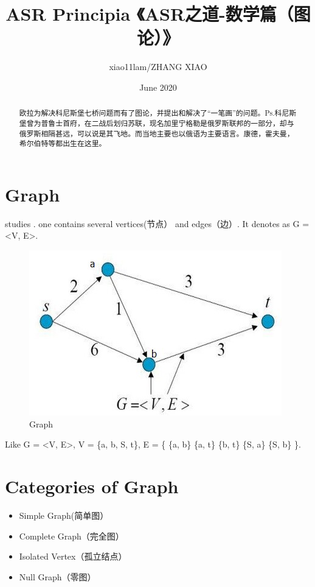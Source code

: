 \documentclass{article}
\title{ASR Principia 《ASR之道-数学篇（图论）》}
\author{xiao11lam/ZHANG XIAO }
\date{June 2020}
\begin{document}
\maketitle
\begin{abstract}
欧拉为解决科尼斯堡七桥问题而有了图论，并提出和解决了“一笔画”的问题。Ps.科尼斯堡曾为普鲁士首府，在二战后划归苏联，现名加里宁格勒是俄罗斯联邦的一部分，却与俄罗斯相隔甚远，可以说是其飞地。而当地主要也以俄语为主要语言。康德，霍夫曼，希尔伯特等都出生在这里。
\end{abstract}

\section{Graph}
 studies  . one  contains several vertices(节点） and edges（边）.  It denotes as G = <V, E>. 

\begin{figure}[h!]
\centering
\includegraphics[scale=0.7]{fig1}
\caption{Graph}
\label{fig:ss}
\end{figure}

\begin{flusleft}
Like G = <V, E>,
\quad 
     V = \left\{a, b, S, t\right\},
\quad
     E = \left\{
         \left\{a, b\right\} 
         \left\{a, t\right\} 
         \left\{b, t\right\} 
         \left\{S, a\right\} 
         \left\{S, b\right\}
         \right\}.
\end{flusleft}

\section{Categories of Graph}
\begin{itemize}
    \item  Simple Graph(简单图）
    
    
\begin{flushleft}
\end{flushleft}
    \item  Complete Graph（完全图）
    
\begin{flushleft}
\end{flushleft}
    \item  Isolated Vertex（孤立结点）

\begin{flushleft}
\end{flushleft}
    \item  Null Graph（零图）
\end{itemize}
    
\end{document}
